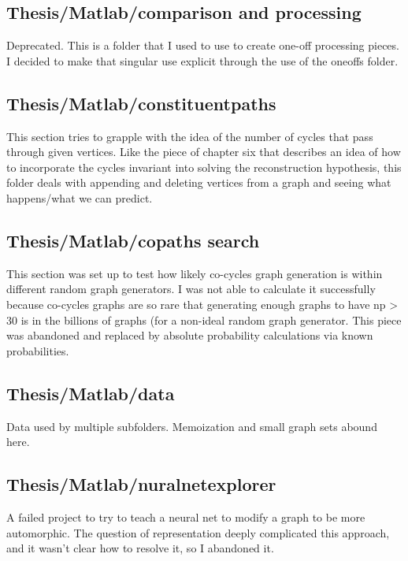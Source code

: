\subsection*{Thesis/Matlab/comparison and processing}

Deprecated.
This is a folder that I used to use to create one-off processing pieces.
I decided to make that singular use explicit through the use of the oneoffs folder.

\subsection*{Thesis/Matlab/constituentpaths}

This section tries to grapple with the idea of the number of cycles that pass through given vertices.
Like the piece of chapter six that describes an idea of how to incorporate the cycles invariant into solving the reconstruction hypothesis, this folder deals with appending and deleting vertices from a graph and seeing what happens/what we can predict.

\subsection*{Thesis/Matlab/copaths search}

This section was set up to test how likely co-cycles graph generation is within different random graph generators.
I was not able to calculate it successfully because co-cycles graphs are so rare that generating enough graphs to have np > 30 is in the billions of graphs (for a non-ideal random graph generator.
This piece was abandoned and replaced by absolute probability calculations via known probabilities.

\subsection*{Thesis/Matlab/data}

Data used by multiple subfolders.
Memoization and small graph sets abound here.

\subsection*{Thesis/Matlab/nuralnetexplorer}

A failed project to try to teach a neural net to modify a graph to be more automorphic.  The question of representation deeply complicated this approach, and it wasn't clear how to resolve it, so I abandoned it.

